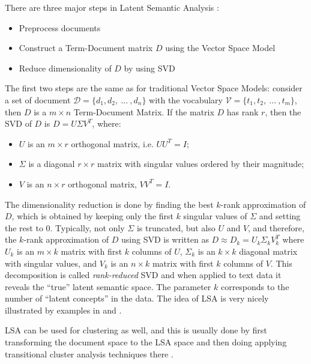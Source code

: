 There are three major steps in Latent Semantic Analysis  \cite{evangelopoulos2012latent}:

\begin{itemize}
\itemsep1pt\parskip0pt
\item
  Preprocess documents
\item
  Construct a Term-Document matrix $D$ using the Vector Space Model
\item
  Reduce dimensionality of $D$ by using SVD
\end{itemize}


The first two steps are the same as for traditional Vector Space Models:
consider a set of document $\mathcal D = \{ d_1, d_2, \ ... \ , d_n \}$
with the vocabulary $\mathcal V = \{t_1, t_2, \ ... \ , t_m \}$, then
$D$ is a $m \times n$ Term-Document Matrix. If the matrix $D$ has
rank $r$, then the SVD of $D$ is $D = U  \Sigma V^T$, where:

\begin{itemize}
\itemsep1pt\parskip0pt
\item $U$ is an $m \times r$ orthogonal matrix, i.e. $U U^T = I$;
\item $\Sigma$ is a diagonal $r \times r$ matrix with singular values ordered by their magnitude;
\item $V$ is an $n \times r$ orthogonal matrix, $V V^T = I$.
\end{itemize}

The dimensionality reduction is done by finding the best $k$-rank approximation
of $D$, which is obtained by keeping only the first $k$ singular values of $\Sigma$
and setting the rest to 0.
Typically, not only $\Sigma$ is truncated, but also $U$ and $V$,
and therefore, the $k$-rank approximation of $D$ using SVD is written as
$D \approx D_k = U_k \Sigma_k V_k^T$ where $U_k$ is an $m \times k$
matrix with first $k$ columns of $U$, $\Sigma_k$ is an $k \times k$
diagonal matrix with singular values, and $V_k$ is an $n \times k$
matrix with first $k$ columns of $V$.  This decomposition
is called \emph{rank-reduced} SVD and when applied to text data
it reveals the ``true'' latent semantic space. The parameter $k$ corresponds
to the number of ``latent concepts'' in the data. The idea
of LSA is very nicely illustrated by examples  in
\cite{deerwester1990indexing} and \cite{landauer1998introduction}.

LSA can be used for clustering as well, and this is usually done
by first transforming the document space to the LSA space
and then doing applying transitional cluster analysis techniques
there \cite{schutze1997projections}.

